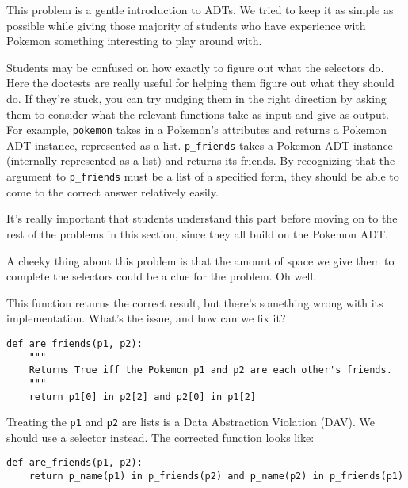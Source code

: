 \begin{questionmeta}
This problem is a gentle introduction to ADTs. We tried to keep it as simple as possible while giving those majority of students who
have experience with Pokemon something interesting to play around with. 

Students may be confused on how exactly to figure out what the selectors do. Here the doctests are really useful for helping them 
figure out what they should do. If they're stuck, you can try nudging them in the right direction by asking them to consider what
the relevant functions take as input and give as output. For example, \lstinline{pokemon} takes in a Pokemon's attributes and 
returns a Pokemon ADT instance, represented as a list. \lstinline{p_friends} takes a Pokemon ADT instance (internally represented
as a list) and returns its friends. By recognizing that the argument to \lstinline{p_friends} must be a list of a specified form,
they should be able to come to the correct answer relatively easily. 

It's really important that students understand this part before moving on to the rest of the problems in this section, since they
all build on the Pokemon ADT. 

A cheeky thing about this problem is that the amount of space we give them to complete the selectors could be a clue for the problem.
Oh well. 
\end{questionmeta}
    
    \begin{blocksection}
    \question This function returns the correct result, but there's something wrong
    with its implementation. What's the issue, and how can we fix it?
    
    \begin{lstlisting}
def are_friends(p1, p2):
    """
    Returns True iff the Pokemon p1 and p2 are each other's friends.
    """
    return p1[0] in p2[2] and p2[0] in p1[2]
    \end{lstlisting}
    \begin{solution}[0.5in]
    Treating the \lstinline{p1} and \lstinline{p2} are lists is a Data Abstraction Violation (DAV).
    We should use a selector instead.
    The corrected function looks like:
    \begin{lstlisting}
def are_friends(p1, p2):
    return p_name(p1) in p_friends(p2) and p_name(p2) in p_friends(p1)
    \end{lstlisting}
    \end{solution}
    \end{blocksection}

